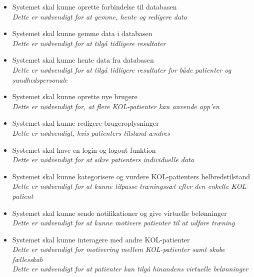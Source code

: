 \begin{itemize}
\item Systemet skal kunne oprette forbindelse til databasen
	\\
	\textit{Dette er nødvendigt for at gemme, hente og redigere data}

\item Systemet skal kunne gemme data i databasen
	\\
	\textit{Dette er nødvendigt for at tilgå tidligere resultater}

\item Systemet skal kunne hente data fra databasen
	\\
	\textit{Dette er nødvendigt for at tilgå tidligere resultater for både patienter og sundhedspersonale}	
	
\item Systemet skal kunne oprette nye brugere 
	\\
	\textit{Dette er nødvendigt for, at flere KOL-patienter kan anvende app'en}

\item Systemet skal kunne redigere brugeroplysninger
	\\
	\textit{Dette er nødvendigt, hvis patienters tilstand ændres}

\item Systemet skal have en login og logout funktion
	\\
	\textit{Dette er nødvendigt for at sikre patienters individuelle data}

\item Systemet skal kunne kategorisere og vurdere  KOL-patienters helbredstilstand 
	\\
	\textit{Dette er nødvendigt for at kunne tilpasse træningssæt efter den enkelte KOL-patient}

\item Systemet skal kunne sende notifikationer og give virtuelle belønninger 
	\\
	\textit{Dette er nødvendigt for at kunne motivere patienter til at udføre træning}

\item Systemet skal kunne interagere med andre KOL-patienter
	\\
	\textit{Dette er nødvendigt for motivering mellem KOL-patienter samt skabe fællesskab}
	\\
	\textit{Dette er nødvendigt for at patienter kan tilgå hinandens virtuelle belønninger}

\end{itemize}

